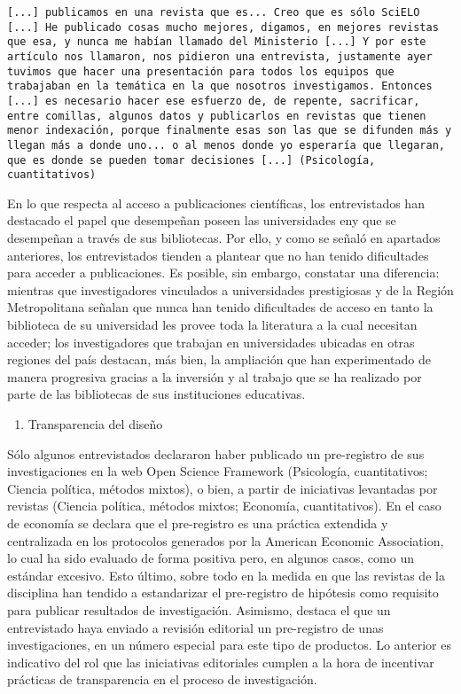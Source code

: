 \documentclass[
  letterpaper,
  DIV=11,
  numbers=noendperiod]{scrreprt}
\providecommand{\tightlist}{%
  \setlength{\itemsep}{0pt}\setlength{\parskip}{0pt}}\usepackage{longtable,booktabs,array}
\begin{document}
\begin{verbatim}
[...] publicamos en una revista que es... Creo que es sólo SciELO [...] He publicado cosas mucho mejores, digamos, en mejores revistas que esa, y nunca me habían llamado del Ministerio [...] Y por este artículo nos llamaron, nos pidieron una entrevista, justamente ayer tuvimos que hacer una presentación para todos los equipos que trabajaban en la temática en la que nosotros investigamos. Entonces [...] es necesario hacer ese esfuerzo de, de repente, sacrificar, entre comillas, algunos datos y publicarlos en revistas que tienen menor indexación, porque finalmente esas son las que se difunden más y llegan más a donde uno... o al menos donde yo esperaría que llegaran, que es donde se pueden tomar decisiones [...] (Psicología, cuantitativos)
\end{verbatim}

En lo que respecta al acceso a publicaciones científicas, los
entrevistados han destacado el papel que desempeñan poseen las
universidades eny que se desempeñan a través de sus bibliotecas. Por
ello, y como se señaló en apartados anteriores, los entrevistados
tienden a plantear que no han tenido dificultades para acceder a
publicaciones. Es posible, sin embargo, constatar una diferencia:
mientras que investigadores vinculados a universidades prestigiosas y de
la Región Metropolitana señalan que nunca han tenido dificultades de
acceso en tanto la biblioteca de su universidad les provee toda la
literatura a la cual necesitan acceder; los investigadores que trabajan
en universidades ubicadas en otras regiones del país destacan, más bien,
la ampliación que han experimentado de manera progresiva gracias a la
inversión y al trabajo que se ha realizado por parte de las bibliotecas
de sus instituciones educativas.

\begin{enumerate}
\def\labelenumi{\alph{enumi})}
\setcounter{enumi}{1}
\tightlist
\item
  Transparencia del diseño
\end{enumerate}

Sólo algunos entrevistados declararon haber publicado un pre-registro de
sus investigaciones en la web Open Science Framework (Psicología,
cuantitativos; Ciencia política, métodos mixtos), o bien, a partir de
iniciativas levantadas por revistas (Ciencia política, métodos mixtos;
Economía, cuantitativos). En el caso de economía se declara que el
pre-registro es una práctica extendida y centralizada en los protocolos
generados por la American Economic Association, lo cual ha sido evaluado
de forma positiva pero, en algunos casos, como un estándar excesivo.
Esto último, sobre todo en la medida en que las revistas de la
disciplina han tendido a estandarizar el pre-registro de hipótesis como
requisito para publicar resultados de investigación. Asimismo, destaca
el que un entrevistado haya enviado a revisión editorial un pre-registro
de unas investigaciones, en un número especial para este tipo de
productos. Lo anterior es indicativo del rol que las iniciativas
editoriales cumplen a la hora de incentivar prácticas de transparencia
en el proceso de investigación.
\end{document}
